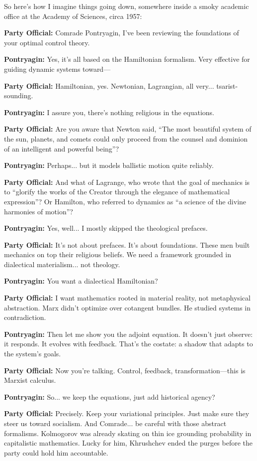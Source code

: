 So here’s how I imagine things going down, somewhere inside a smoky academic office at the Academy of Sciences, circa 1957:

{
\ttfamily
\textbf{Party Official:} Comrade Pontryagin, I’ve been reviewing the foundations of your optimal control theory.  

\textbf{Pontryagin:} Yes, it’s all based on the Hamiltonian formalism. Very effective for guiding dynamic systems toward—  

\textbf{Party Official:} Hamiltonian, yes. Newtonian, Lagrangian, all very... tsarist-sounding.  

\textbf{Pontryagin:} I assure you, there’s nothing religious in the equations.  

\textbf{Party Official:} Are you aware that Newton said, “The most beautiful system of the sun, planets, and comets could only proceed from the counsel and dominion of an intelligent and powerful being”?  

\textbf{Pontryagin:} Perhaps... but it models ballistic motion quite reliably.  

\textbf{Party Official:} And what of Lagrange, who wrote that the goal of mechanics is to “glorify the works of the Creator through the elegance of mathematical expression”? Or Hamilton, who referred to dynamics as “a science of the divine harmonies of motion”?  

\textbf{Pontryagin:} Yes, well... I mostly skipped the theological prefaces.  

\textbf{Party Official:} It’s not about prefaces. It’s about foundations. These men built mechanics on top their religious beliefs. We need a framework grounded in dialectical materialism... not theology.  

\textbf{Pontryagin:} You want a dialectical Hamiltonian?  

\textbf{Party Official:} I want mathematics rooted in material reality, not metaphysical abstraction. Marx didn’t optimize over cotangent bundles. He studied systems in contradiction.  

\textbf{Pontryagin:} Then let me show you the adjoint equation. It doesn’t just observe: it responds. It evolves with feedback. That’s the costate: a shadow that adapts to the system’s goals.  

\textbf{Party Official:} Now you're talking. Control, feedback, transformation—this is Marxist calculus.  

\textbf{Pontryagin:} So... we keep the equations, just add historical agency?  

\textbf{Party Official:} Precisely. Keep your variational principles. Just make sure they steer us toward socialism. And Comrade... be careful with those abstract formalisms. Kolmogorov was already skating on thin ice grounding probability in capitalistic mathematics. Lucky for him, Khrushchev ended the purges before the party could hold him accountable.
}


